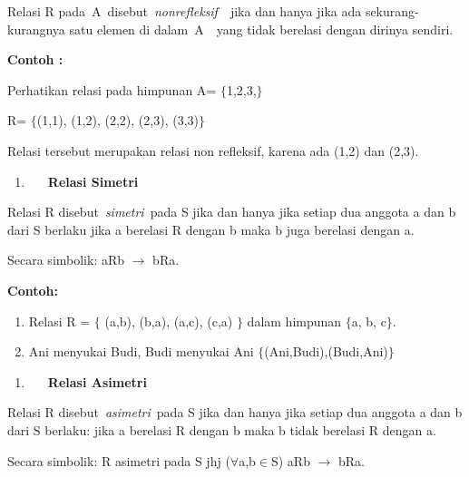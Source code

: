 \documentclass[11pt,fleqn]{book} %
\begin{document}
\noindent 

\noindent Relasi R pada~A~disebut~\textit{nonrefleksif}~~jika dan hanya jika ada sekurang-kurangnya satu elemen di dalam~A~~yang tidak berelasi dengan dirinya sendiri.

\noindent 

\noindent \textbf{Contoh :}

\noindent \textbf{}

\noindent Perhatikan relasi pada himpunan A= $\{$1,2,3,$\}$

\noindent R= $\{$(1,1), (1,2), (2,2), (2,3), (3,3)$\}$

\noindent Relasi tersebut merupakan relasi non refleksif, karena ada (1,2) dan (2,3).

\noindent 

\noindent 

\begin{enumerate}
\item  ~~~\textbf{Relasi Simetri}
\end{enumerate}

\noindent 

\noindent Relasi R disebut~\textit{simetri}~pada S jika dan hanya jika setiap dua anggota a dan b dari S berlaku jika a berelasi R dengan b maka b juga berelasi dengan a. 

\noindent Secara simbolik: aRb $\mathrm{\to}$ bRa.

\noindent 

\noindent \textbf{Contoh:}

\begin{enumerate}
\item \textbf{ }Relasi R = $\{$ (a,b), (b,a), (a,c), (c,a) $\}$ dalam himpunan $\{$a, b, c$\}$.

\item  Ani menyukai Budi, Budi menyukai Ani $\{$(Ani,Budi),(Budi,Ani)$\}$
\end{enumerate}

\noindent 

\begin{enumerate}
\item  ~~~\textbf{Relasi Asimetri}
\end{enumerate}

\noindent \textbf{}

\noindent Relasi R disebut~\textit{asimetri}~pada S jika dan hanya jika setiap dua anggota a dan b dari S berlaku: jika a berelasi R dengan b maka b tidak berelasi R dengan a.

\noindent Secara simbolik: R asimetri pada S jhj ($\mathrm{\forall }$a,b$\mathrm{\in }$S) aRb $\mathrm{\to}$ bRa.
\end{document}
